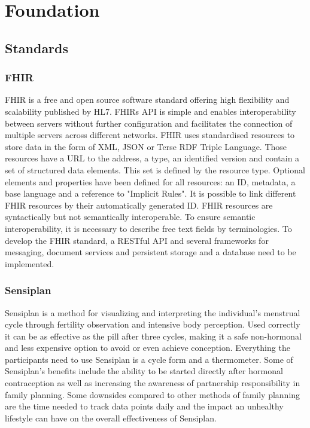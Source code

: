 \documentclass[
a4paper,
11pt
]{article}
\begin{document}
	\section{Foundation}
	
	\subsection{Standards}
	
	\subsubsection{FHIR}
	\ac{FHIR} is a free and open source software standard offering high flexibility and scalability published by \ac{HL7}. \acp{FHIR} \ac{API} is simple and enables interoperability between servers without further configuration and facilitates the connection of multiple servers across different networks. \ac{FHIR} uses standardised resources to store data in the form of \ac{XML}, \ac{JSON} or Terse \ac{RDF} Triple Language. Those resources have a \ac{URL} to the address, a type, an identified version and contain a set of structured data elements. This set is defined by the resource type. Optional elements and properties have been defined for all resources: an ID, metadata, a base language and a reference to "Implicit Rules".  It is possible to link different \ac{FHIR} resources by their automatically generated ID. \ac{FHIR} resources are syntactically but not semantically interoperable. To ensure semantic interoperability, it is necessary to describe free text fields by terminologies. To develop the \ac{FHIR} standard, a \ac{REST}ful \ac{API} and several frameworks for messaging, document services and persistent storage and a database need to be implemented.\cite{noauthor_overview_nodate}
	\subsubsection{Sensiplan\textsuperscript{\textcopyright}}
	
	Sensiplan\textsuperscript{\textcopyright} is a method for visualizing and interpreting the individual's menstrual cycle through fertility observation and intensive body perception. Used correctly it can be as effective as the pill after three cycles, making it a safe non-hormonal and less expensive option to avoid or even achieve conception\cite{noauthor_safety_nodate}. Everything the participants need to use Sensiplan\textsuperscript{\textcopyright} is a cycle form and a thermometer. Some of Sensiplan's\textsuperscript{\textcopyright} benefits include the ability to be started directly after hormonal contraception as well as increasing the awareness of partnership responsibility in family planning. Some downsides compared to other methods of family planning are the time needed to track data points daily and the impact an unhealthy lifestyle can have on the overall effectiveness of Sensiplan\textsuperscript{\textcopyright}.\cite{noauthor_home_nodate}
	
\end{document}

